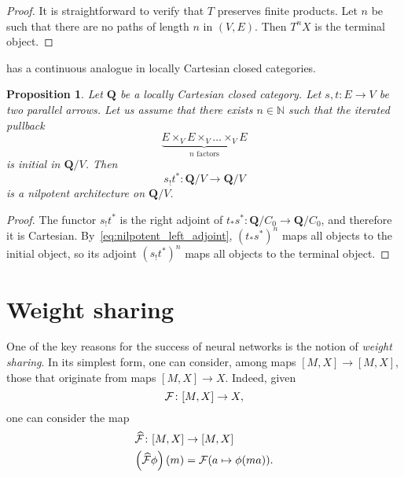 \documentclass[12pt]{article}
\newtheorem{proposition}{Proposition}
\newcommand{\N}{{\mathbb{N}}}
\newcommand{\QCat}{{\mathbf{Q}}}
\begin{document}
\begin{proof}
    It is straightforward to verify that $T$ preserves finite products. Let $n$ be such that there are no paths of length $n$ in $(V, E)$. Then $T^n X$ is the terminal object.
\end{proof}

 has a continuous analogue in locally Cartesian closed categories.
\begin{proposition}\label{[prop]:categorical_architecture}
    Let $\QCat$ be a locally Cartesian closed category. Let $s, t\colon E \rightarrow V$ be two parallel arrows. Let us assume that there exists $n \in \N$ such that the iterated pullback
    \begin{equation}\label{eq:nilpotent_left_adjoint}
       \underbrace{E \times_V E \times_V \dots \times_V E}_{n \text{ factors}}
    \end{equation}
    is initial in $\QCat/V$.
    Then
    \begin{equation*}
        s_!t^*\colon \QCat/V \rightarrow \QCat/V
    \end{equation*}
    is a nilpotent architecture on $\QCat/V$.
\end{proposition}

\begin{proof}
    The functor $s_!t^*$ is the right adjoint of  $t_*s^*\colon \QCat/C_0 \rightarrow \QCat/C_0$, and therefore it is Cartesian. By~\cref{eq:nilpotent_left_adjoint}, $(t_*s^*)^n$ maps all objects to the initial object, so its adjoint $(s_!t^*)^n$ maps all objects to the terminal object.
\end{proof}

\section{Weight sharing}

One of the key reasons for the success of neural networks is the notion of {\em weight sharing}. In its simplest form, one can consider, among maps $[M, X] \rightarrow [M, X]$, those that originate from maps $[M, X] \rightarrow X$. Indeed, given
\begin{equation*}
    {\cal F} \colon [M, X] \rightarrow X,
\end{equation*}
one can consider the map
\begin{align*}
    \widehat{\cal F} \colon [M, X] &\rightarrow [M, X] \\
    \left(\widehat{\cal F}\phi\right)(m) &= {\cal F}(a \mapsto \phi(ma)).
\end{align*}
\end{document}
